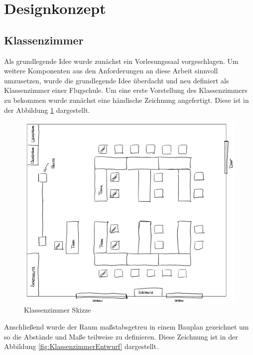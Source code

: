 \section{Designkonzept}



\subsection{Klassenzimmer}
Als grundlegende Idee wurde zunächst ein Vorlesungssaal vorgeschlagen.
Um weitere Komponenten aus den Anforderungen an diese Arbeit sinnvoll umzusetzen,
wurde die grundlegende Idee überdacht und neu definiert als Klassenzimmer einer Flugschule.
\newparagraph
Um eine erste Vorstellung des Klassenzimmers zu bekommen wurde zunächst eine händische Zeichnung angefertigt.
Diese ist in der Abbildung \ref{fig:KlassenzimmerSkizze} dargestellt.
\begin{figure}[H]
  \centering
  \includegraphics[width=1\textwidth]{images/roomModel_OneNote.pdf}
  \caption{Klassenzimmer Skizze}
  \label{fig:KlassenzimmerSkizze}
\end{figure}\noindent
Anschließend wurde der Raum maßstabsgetreu in einem Bauplan gezeichnet um so die Abstände und Maße teilweise zu definieren.
Diese Zeichnung ist in der Abbildung \ref{fig:KlassenzimmerEntwurf} dargestellt.

